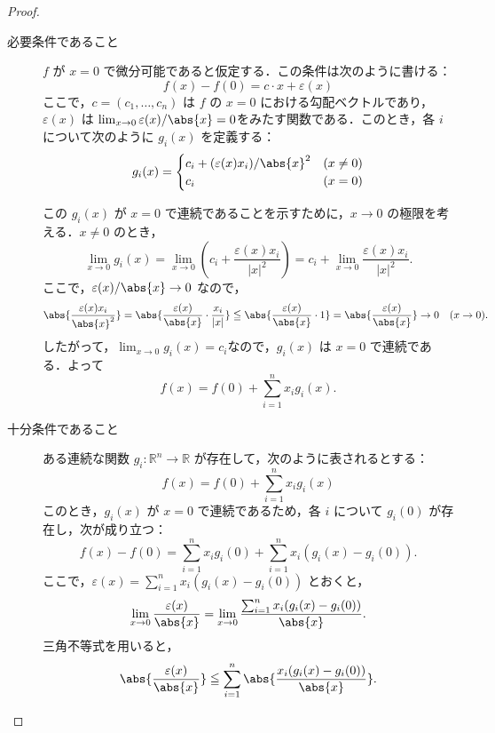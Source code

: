 \documentclass[a4paper,10pt,fleqn]{ltjsarticle}
\begin{document}
\begin{tleftbar}
    \begin{proof}
        \begin{description}
            \item[必要条件であること]
                  $ f $ が $ x=0 $ で微分可能であると仮定する．この条件は次のように書ける：
                  \[
                      f(x) - f(0) = c \cdot x + \varepsilon(x)
                  \]
                  ここで，$ c = (c_1, \ldots, c_n) $ は $ f $ の $ x=0 $ における勾配ベクトルであり，$ \varepsilon(x) $ は
                  $\lim_{x \to 0} \varepsilon(x)/\abs{x} = 0$をみたす関数である．このとき，各 $ i $ について次のように $ g_i(x) $ を定義する：
                  \[
                      g_i(x) =
                      \begin{cases}
                          c_i + (\varepsilon(x) x_i)/\abs{x}^2 & (x \ne 0) \\
                          c_i                                  & (x = 0)
                      \end{cases}
                  \]

                  この $ g_i(x) $ が $ x=0 $ で連続であることを示すために，$ x \to 0 $ の極限を考える．$ x \ne 0 $ のとき，
                  \[
                      \lim_{x \to 0} g_i(x) = \lim_{x \to 0} \left( c_i + \frac{\varepsilon(x) x_i}{|x|^2} \right) = c_i + \lim_{x \to 0} \frac{\varepsilon(x) x_i}{|x|^2}.
                  \]
                  ここで，$\varepsilon(x)/\abs{x} \to 0 $ なので，
                  \[
                      \abs{\frac{\varepsilon(x) x_i}{\abs{x}^2}} = \abs{\frac{\varepsilon(x)}{\abs{x}} \cdot \frac{x_i}{|x|}} \leqq  \abs{\frac{\varepsilon(x)}{\abs{x}} \cdot 1} = \abs{\frac{\varepsilon(x)}{\abs{x}}} \to 0 \quad (x \to 0).
                  \]
                  したがって，$\lim_{x \to 0} g_i(x) = c_i$なので，$ g_i(x) $ は $ x=0 $ で連続である．よって
                  \[
                      f(x) = f(0) + \sum_{i=1}^n x_i g_i(x).
                  \]
            \item [十分条件であること]
                  ある連続な関数 $ g_i \colon \mathbb{R}^n \to \mathbb{R} $ が存在して，次のように表されるとする：
                  \[
                      f(x) = f(0) + \sum_{i=1}^n x_i g_i(x)
                  \]
                  このとき，$ g_i(x) $ が $ x=0 $ で連続であるため，各 $ i $ について $ g_i(0) $ が存在し，次が成り立つ：
                  \[
                      f(x) - f(0) = \sum_{i=1}^n x_i g_i(0) + \sum_{i=1}^n x_i (g_i(x) - g_i(0)).
                  \]
                  ここで，$ \varepsilon(x) = \sum_{i=1}^n x_i (g_i(x) - g_i(0)) $ とおくと，
                  \[
                      \lim_{x \to 0} \frac{\varepsilon(x)}{\abs{x}} = \lim_{x \to 0} \frac{\sum_{i=1}^n x_i (g_i(x) - g_i(0))}{\abs{x}}.
                  \]
                  三角不等式を用いると，
                  \[
                      \abs{ \frac{\varepsilon(x)}{\abs{x}} } \leqq \sum_{i=1}^n \abs{ \frac{x_i(g_i(x) - g_i(0))}{\abs{x}} }.
                  \]


\end{description}
\end{proof}
\end{tleftbar}
\end{document}
